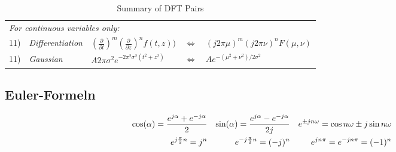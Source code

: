 \begin{table}[htbp]
\begin{tabularx}{\linewidth}{|rp{6cm}XlX|}
		\multicolumn{5}{|l|}{\textit{For continuous variables only:}} \\
		11) & \textit{Differentiation} & $\left(\frac{\partial}{\partial t}\right)^m \left(\frac{\partial}{\partial z}\right)^n f(t,z) )$ & $\Leftrightarrow$ & $ (j 2 \pi \mu)^m (j 2 \pi \nu)^n F(\mu,\nu)$ \\
		11) & \textit{Gaussian} & $A 2 \pi \sigma^2 e^{-2 \pi^2 \sigma^2 (t^2+z^2)}$ & $\Leftrightarrow$ & $ Ae^{-(\mu^2+\nu^2)/2\sigma^2}$ \\
	\hline
	\end{tabularx}
	\caption{Summary of DFT Pairs}
	\label{tab:DFT_Pairs}
\end{table}

\newpage


\begin{multicols}{2}
	
	

	\columnbreak

	
	
\end{multicols}


\subsection{Euler-Formeln}
\begin{align}
	\cos(\alpha) = \frac{e^{j\alpha} + e^{-j\alpha}}{2}
	&& \sin(\alpha) = \frac{e^{j\alpha} - e^{-j\alpha}}{2j} &&
	    {e}^{\pm jn\omega} = \cos{n\omega} \pm j \sin{n\omega} \notag\\
	e^{j\frac{\pi}{2}n} = j^n & & e^{-j\frac{\pi}{2}n} = (-j)^n &&
	e^{jn\pi}=e^{-jn\pi}=(-1)^n \notag
\end{align}
